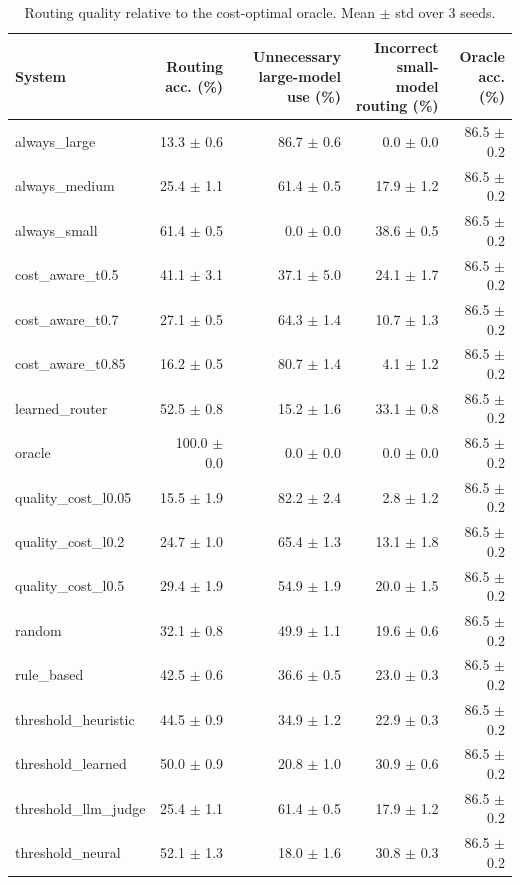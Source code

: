 \begin{table}[t]
\centering
\small
\caption{Routing quality relative to the cost-optimal oracle. Mean $\pm$ std over 3 seeds.}
\label{tab:routing}
\begin{tabular}{lrrrr}
\toprule
System & Routing acc. (\%) & Unnecessary large-model use (\%) & Incorrect small-model routing (\%) & Oracle acc. (\%) \\
\midrule
always\_large & 13.3 $\pm$ 0.6 & 86.7 $\pm$ 0.6 & 0.0 $\pm$ 0.0 & 86.5 $\pm$ 0.2 \\
always\_medium & 25.4 $\pm$ 1.1 & 61.4 $\pm$ 0.5 & 17.9 $\pm$ 1.2 & 86.5 $\pm$ 0.2 \\
always\_small & 61.4 $\pm$ 0.5 & 0.0 $\pm$ 0.0 & 38.6 $\pm$ 0.5 & 86.5 $\pm$ 0.2 \\
cost\_aware\_t0.5 & 41.1 $\pm$ 3.1 & 37.1 $\pm$ 5.0 & 24.1 $\pm$ 1.7 & 86.5 $\pm$ 0.2 \\
cost\_aware\_t0.7 & 27.1 $\pm$ 0.5 & 64.3 $\pm$ 1.4 & 10.7 $\pm$ 1.3 & 86.5 $\pm$ 0.2 \\
cost\_aware\_t0.85 & 16.2 $\pm$ 0.5 & 80.7 $\pm$ 1.4 & 4.1 $\pm$ 1.2 & 86.5 $\pm$ 0.2 \\
learned\_router & 52.5 $\pm$ 0.8 & 15.2 $\pm$ 1.6 & 33.1 $\pm$ 0.8 & 86.5 $\pm$ 0.2 \\
oracle & 100.0 $\pm$ 0.0 & 0.0 $\pm$ 0.0 & 0.0 $\pm$ 0.0 & 86.5 $\pm$ 0.2 \\
quality\_cost\_l0.05 & 15.5 $\pm$ 1.9 & 82.2 $\pm$ 2.4 & 2.8 $\pm$ 1.2 & 86.5 $\pm$ 0.2 \\
quality\_cost\_l0.2 & 24.7 $\pm$ 1.0 & 65.4 $\pm$ 1.3 & 13.1 $\pm$ 1.8 & 86.5 $\pm$ 0.2 \\
quality\_cost\_l0.5 & 29.4 $\pm$ 1.9 & 54.9 $\pm$ 1.9 & 20.0 $\pm$ 1.5 & 86.5 $\pm$ 0.2 \\
random & 32.1 $\pm$ 0.8 & 49.9 $\pm$ 1.1 & 19.6 $\pm$ 0.6 & 86.5 $\pm$ 0.2 \\
rule\_based & 42.5 $\pm$ 0.6 & 36.6 $\pm$ 0.5 & 23.0 $\pm$ 0.3 & 86.5 $\pm$ 0.2 \\
threshold\_heuristic & 44.5 $\pm$ 0.9 & 34.9 $\pm$ 1.2 & 22.9 $\pm$ 0.3 & 86.5 $\pm$ 0.2 \\
threshold\_learned & 50.0 $\pm$ 0.9 & 20.8 $\pm$ 1.0 & 30.9 $\pm$ 0.6 & 86.5 $\pm$ 0.2 \\
threshold\_llm\_judge & 25.4 $\pm$ 1.1 & 61.4 $\pm$ 0.5 & 17.9 $\pm$ 1.2 & 86.5 $\pm$ 0.2 \\
threshold\_neural & 52.1 $\pm$ 1.3 & 18.0 $\pm$ 1.6 & 30.8 $\pm$ 0.3 & 86.5 $\pm$ 0.2 \\
\bottomrule
\end{tabular}
\end{table}
